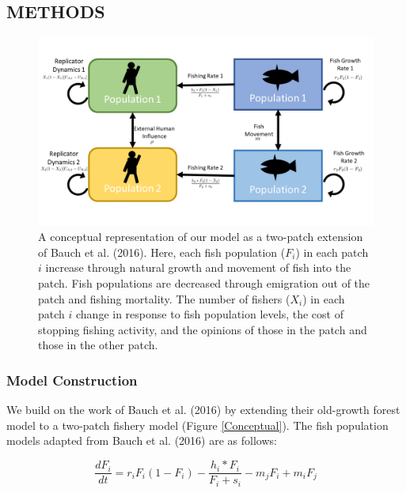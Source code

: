 \documentclass[
  12pt,
]{article}
\begin{document}
\hypertarget{methods-1}{%
\subsection{METHODS}\label{methods-1}}

\begin{figure}
\includegraphics[width=1\linewidth]{CoupledModelConceptual} \caption{A conceptual representation of our model as a two-patch extension of Bauch et al. (2016). Here, each fish population (\(F_i\)) in each patch \(i\) increase through natural growth and movement of fish into the patch. Fish populations are decreased through emigration out of the patch and fishing mortality. The number of fishers (\(X_i\)) in each patch \(i\) change in response to fish population levels, the cost of stopping fishing activity, and the opinions of those in the patch and those in the other patch. \label{Conceptual}}\label{fig:Conceptual}
\end{figure}



\hypertarget{model-construction}{%
\subsubsection{Model Construction}\label{model-construction}}

We build on the work of Bauch et al. (2016) by extending their old-growth forest model to a two-patch fishery model (Figure \ref{Conceptual}). The fish population models adapted from Bauch et al. (2016) are as follows:

\begin{equation} 
  \frac{dF_i}{dt} = r_iF_i(1-F_i)-\frac{h_i*F_i}{F_i + s_i} - m_jF_i + m_iF_j
  \label{eq:fish1}
\end{equation}
\end{document}
